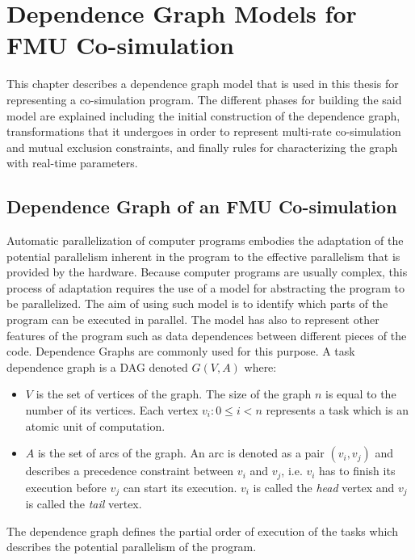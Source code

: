 \chapter{\label{ch:4-accel}Dependence Graph Models for FMU Co-simulation} 

\minitoc

This chapter describes a dependence graph model that is used in this thesis for representing a co-simulation program. The different phases for building the said model are explained including the initial construction of the dependence graph, transformations that it undergoes in order to represent multi-rate co-simulation and mutual exclusion constraints, and finally rules for characterizing the graph with real-time parameters.
 
\section{\label{sec:4-depgrph}Dependence Graph of an FMU Co-simulation}

Automatic parallelization of computer programs embodies the adaptation of the potential parallelism inherent in the program to the effective parallelism that is provided by the hardware. Because computer programs are usually complex, this process of adaptation requires the use of a model for abstracting the program to be parallelized. The aim of using such model is to identify which parts of the program can be executed in parallel. The model has also to represent other features of the program such as data dependences between different pieces of the code. Dependence Graphs are commonly used for this purpose. A task dependence graph is a DAG denoted $G(V,A)$ where:
\begin{itemize}
\item $V$ is the set of vertices of the graph. The size of the graph $n$ is equal to the number of its vertices. Each vertex $v_i: 0 \leq i < n$ represents a task which is an atomic unit of computation.
\item $A$ is the set of arcs of the graph. An arc is denoted as a pair $(v_i,v_j)$ and describes a precedence constraint between $v_i$ and $v_j$, i.e. $v_i$ has to finish its execution before $v_j$ can start its execution. $v_i$ is called the \textit{head} vertex and $v_j$ is called the \textit{tail} vertex. 
\end{itemize}

The dependence graph defines the partial order of execution of the tasks which describes the potential parallelism of the program. %


